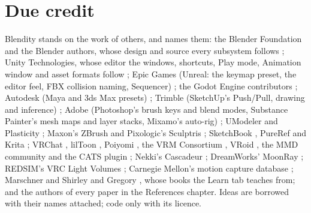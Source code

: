 \section{Due credit}
Blendity stands on the work of others, and  names them: the Blender Foundation and the Blender authors,
whose design and source every subsystem follows \cite{Blender2026}; Unity Technologies, whose editor the windows,
shortcuts, Play mode, Animation window and asset formats follow \cite{UnityManual2026}; Epic Games (Unreal: the keymap
preset, the editor feel, FBX collision naming, Sequencer) \cite{UnrealDocs2026}; the Godot Engine contributors
\cite{GodotDocs2026}; Autodesk (Maya and 3ds Max presets) \cite{MayaDocs2026, MaxDocs2026}; Trimble (SketchUp's
Push/Pull, drawing and inference) \cite{SketchUpHelp2026}; Adobe (Photoshop's brush keys and blend modes, Substance
Painter's mesh maps and layer stacks, Mixamo's auto-rig) \cite{PhotoshopHelp2026, SubstancePainterDocs2026, Mixamo2026};
UModeler and Plasticity \cite{UModelerDocs2026, PlasticityDocs2026}; Maxon's ZBrush and Pixologic's Sculptris
\cite{ZBrushDocs2026, SculptrisDocs2026}; SketchBook \cite{SketchBookDocs2026}, PureRef \cite{PureRef2026} and Krita
\cite{Krita2026}; VRChat \cite{VRChatCreators2026}, lilToon \cite{lilToon2026}, Poiyomi \cite{Poiyomi2026}, the VRM
Consortium \cite{MToon2026}, VRoid \cite{VRoid2026}, the MMD community \cite{MMD2026} and the CATS plugin
\cite{CATS2026}; Nekki's Cascadeur \cite{Cascadeur2026}; DreamWorks' MoonRay \cite{MoonRay2026}; REDSIM's VRC Light
Volumes \cite{VRCLightVolumes2026}; Carnegie Mellon's motion capture database \cite{CMUmocap2026}; Marschner and
Shirley \cite{MarschnerShirley2021} and Gregory \cite{Gregory2018vol1, Gregory2018vol2}, whose books the Learn tab
teaches from; and the authors of every paper in the References chapter. Ideas are borrowed with their names attached;
code only with its licence.
